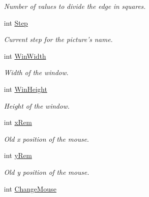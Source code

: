 \begin{DoxyCompactItemize}
\begin{DoxyCompactList}\small\item\em \-Number of values to divide the edge in squares. \end{DoxyCompactList}\item 
\hypertarget{classDraw_a20146731f2945f9b0c25d61e11bb0217}{int \hyperlink{classDraw_a20146731f2945f9b0c25d61e11bb0217}{\-Step}}\label{classDraw_a20146731f2945f9b0c25d61e11bb0217}

\begin{DoxyCompactList}\small\item\em \-Current step for the picture's name. \end{DoxyCompactList}\item 
\hypertarget{classDraw_a7bc33449edbe70d0faa8d9b08ac317e7}{int \hyperlink{classDraw_a7bc33449edbe70d0faa8d9b08ac317e7}{\-Win\-Width}}\label{classDraw_a7bc33449edbe70d0faa8d9b08ac317e7}

\begin{DoxyCompactList}\small\item\em \-Width of the window. \end{DoxyCompactList}\item 
\hypertarget{classDraw_a14d631ded45fe3c6396d41f0b31a8aba}{int \hyperlink{classDraw_a14d631ded45fe3c6396d41f0b31a8aba}{\-Win\-Height}}\label{classDraw_a14d631ded45fe3c6396d41f0b31a8aba}

\begin{DoxyCompactList}\small\item\em \-Height of the window. \end{DoxyCompactList}\item 
\hypertarget{classDraw_a4986cb639db34359529f5bdb3766509e}{int \hyperlink{classDraw_a4986cb639db34359529f5bdb3766509e}{x\-Rem}}\label{classDraw_a4986cb639db34359529f5bdb3766509e}

\begin{DoxyCompactList}\small\item\em \-Old x position of the mouse. \end{DoxyCompactList}\item 
\hypertarget{classDraw_a818fd7b65f3a0d9f59ce4551b9d408bc}{int \hyperlink{classDraw_a818fd7b65f3a0d9f59ce4551b9d408bc}{y\-Rem}}\label{classDraw_a818fd7b65f3a0d9f59ce4551b9d408bc}

\begin{DoxyCompactList}\small\item\em \-Old y position of the mouse. \end{DoxyCompactList}\item 
\hypertarget{classDraw_aa43ab0002e5c0ec8f09f3cdef0f527af}{int \hyperlink{classDraw_aa43ab0002e5c0ec8f09f3cdef0f527af}{\-Change\-Mouse}}\label{classDraw_aa43ab0002e5c0ec8f09f3cdef0f527af}


\end{DoxyCompactItemize}
